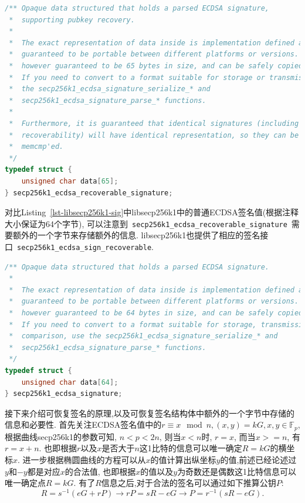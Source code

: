 \documentclass{article}
\newcommand{\F}{\mathbb{F}}
\newcommand{\code}[1]{\lstinline!#1!}
\begin{document}
\begin{lstlisting}[language=c, caption = libsecp256k1中的\textsf{secp256k1_ecdsa_recoverable_signature}, label=lst-libsecp256k1-rsig]
/** Opaque data structured that holds a parsed ECDSA signature,
 *  supporting pubkey recovery.
 *
 *  The exact representation of data inside is implementation defined and not
 *  guaranteed to be portable between different platforms or versions. It is
 *  however guaranteed to be 65 bytes in size, and can be safely copied/moved.
 *  If you need to convert to a format suitable for storage or transmission, use
 *  the secp256k1_ecdsa_signature_serialize_* and
 *  secp256k1_ecdsa_signature_parse_* functions.
 *
 *  Furthermore, it is guaranteed that identical signatures (including their
 *  recoverability) will have identical representation, so they can be
 *  memcmp'ed.
 */
typedef struct {
    unsigned char data[65];
} secp256k1_ecdsa_recoverable_signature;
\end{lstlisting}

对比Listing~\ref{lst-libsecp256k1-sig}中libsecp256k1中的普通ECDSA签名值(根据注释大小保证为64个字节),
可以注意到~\code{secp256k1_ecdsa_recoverable_signature}~需要额外的一个字节来存储额外的信息.
libsecp256k1也提供了相应的签名接口~\code{secp256k1_ecdsa_sign_recoverable}.

\begin{lstlisting}[language=c, caption = libsecp256k1中的\textsf{secp256k1_ecdsa_signature}, label=lst-libsecp256k1-sig]
/** Opaque data structured that holds a parsed ECDSA signature.
 *
 *  The exact representation of data inside is implementation defined and not
 *  guaranteed to be portable between different platforms or versions. It is
 *  however guaranteed to be 64 bytes in size, and can be safely copied/moved.
 *  If you need to convert to a format suitable for storage, transmission, or
 *  comparison, use the secp256k1_ecdsa_signature_serialize_* and
 *  secp256k1_ecdsa_signature_parse_* functions.
 */
typedef struct {
    unsigned char data[64];
} secp256k1_ecdsa_signature;
\end{lstlisting}

接下来介绍可恢复签名的原理,以及可恢复签名结构体中额外的一个字节中存储的信息和必要性.
首先关注ECDSA签名值中的$r \equiv x \mod n, (x, y) = kG, x, y \in \F_p$, 根据曲线secp256k1的参数可知,
$n < p < 2n$, 则当$x < n$时, $r = x$, 而当$x >= n$, 有$r = x + n$. 
也即根据$r$以及$x$是否大于$n$这1比特的信息可以唯一确定$R = kG$的横坐标$x$.
进一步根据椭圆曲线的方程可以从$x$的值计算出纵坐标$y$的值,前述已经论述过$y$和$-y$都是对应$x$的合法值,
也即根据$x$的值以及$y$为奇数还是偶数这1比特信息可以唯一确定点$R = kG$.
有了$R$信息之后,对于合法的签名可以通过如下推算公钥$P$:
$$
R = s^{-1}(eG+rP) \rightarrow rP = sR - eG \rightarrow P = r^{-1}(sR-eG).
$$
\end{document}
